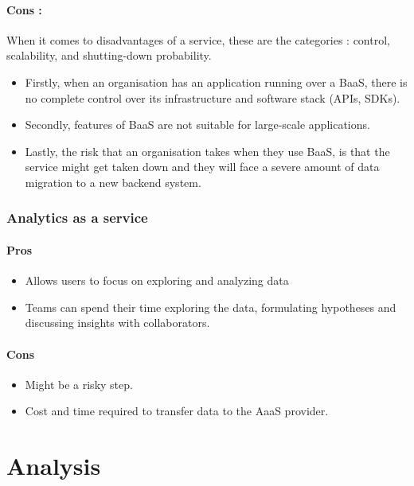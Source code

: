 \documentclass[a4paper,12pt]{report}
\begin{document}
      \subsubsection{Cons :} 
      When it comes to disadvantages of a service, these are the categories :  control, scalability, and shutting-down probability. 
      \begin{itemize}
        \item Firstly, when an organisation has an application running over a BaaS, there is no complete control over its infrastructure and software stack (APIs, SDKs). 
        \item Secondly, features of BaaS are not suitable for large-scale applications. 
        \item Lastly, the risk that an organisation takes when they use BaaS, is that the service might get taken down and they will face a severe amount of data migration to a new backend system.
      \end{itemize}   
    
    \subsection{Analytics as a service}
    \subsubsection{Pros}
    \begin{itemize}
      \item Allows users to focus on exploring and analyzing data      
      \item Teams can spend their time exploring the data, formulating hypotheses and discussing insights with collaborators.      
    \end{itemize}
    
    \subsubsection{Cons}
    \begin{itemize}
      \item Might be a risky step.
      \item Cost and time required to transfer data to the AaaS provider.      
    \end{itemize}

    \chapter {Analysis}
\end{document}
